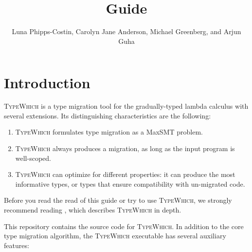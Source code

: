 \documentclass{book}
\title{\system Guide}
\author{Luna Phipps-Costin, Carolyn Jane Anderson, Michael Greenberg, and Arjun Guha}
\newcommand{\system}{\textsc{TypeWhich}\xspace}
\begin{document}
\maketitle

\tableofcontents

\chapter{Introduction}

\system is a type migration tool for the gradually-typed lambda calculus with
several extensions. Its distinguishing characteristics are the following:

\begin{enumerate}

\item \system formulates type migration as a MaxSMT problem.

\item \system always produces a migration, as long as the input program is
   well-scoped.

\item \system can optimize for different properties: it can produce the most
informative types, or types that ensure compatibility with un-migrated code.

\end{enumerate}

Before you read the read of this guide or try to use \system, we strongly recommend
reading \citet{typewhich}, which describes \system in depth.

This repository contains the source code for \system. In addition to the
core type migration algorithm, the \system executable has several auxiliary
features:
\end{document}
